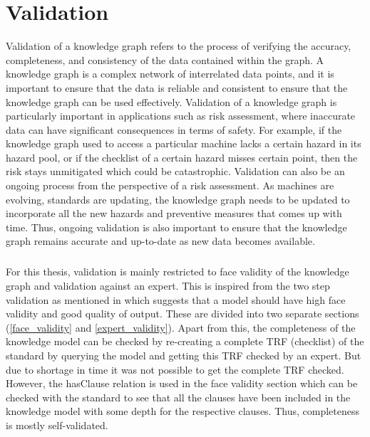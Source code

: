 \chapter{Validation} \label{validation}

\bigskip \bigskip

Validation of a knowledge graph refers to the process of verifying the accuracy, completeness, and consistency of the data contained within the graph. A knowledge graph is a complex network of interrelated data points, and it is important to ensure that the data is reliable and consistent to ensure that the knowledge graph can be used effectively. Validation of a knowledge graph is particularly important in applications such as risk assessment, where inaccurate data can have significant consequences in terms of safety. For example, if the knowledge graph used to access a particular machine lacks a certain hazard in its hazard pool, or if the checklist of a certain hazard misses certain point, then the risk stays unmitigated which could be catastrophic. Validation can also be an ongoing process from the perspective of a risk assessment. As machines are evolving, standards are updating, the knowledge graph needs to be updated to incorporate all the new hazards and preventive measures that comes up with time. Thus, ongoing validation is also important to ensure that the knowledge graph remains accurate and up-to-date as new data becomes available.

\paragraph{} For this thesis, validation is mainly restricted to face validity of the knowledge graph and validation against an expert. This is inspired from the two step validation as mentioned in \cite{sim} which suggests that a model should have high face validity and good quality of output. These are divided into two separate sections (\ref{face_validity} and \ref{expert_validity}). Apart from this, the completeness of the knowledge model can be checked by re-creating a complete TRF (checklist) of the standard by querying the model and getting this TRF checked by an expert. But due to shortage in time it was not possible to get the complete TRF checked. However, the hasClause relation is used in the face validity section which can be checked with the standard to see that all the clauses have been included in the knowledge model with some depth for the respective clauses. Thus, completeness is mostly self-validated. 

